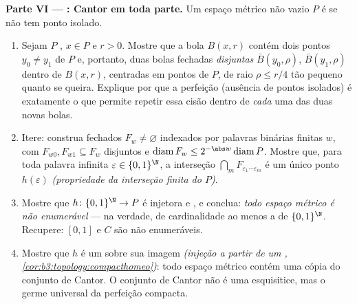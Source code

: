 \begin{problem}
\medskip
\noindent\textbf{Parte VI ---  : Cantor em toda
parte.} Um espaço métrico  não vazio $P$ é \emph{}
se não tem ponto isolado.
\begin{enumerate}[resume]
  \item Sejam $P$  , $x \in P$ e $r > 0$. Mostre
        que a bola $B(x, r)$ contém dois pontos $y_0
        \neq y_1$ de $P$ e, portanto,
        duas bolas fechadas \emph{disjuntas} $\bar B(y_0, \rho)$, $\bar B(y_1, \rho)$ dentro de
        $B(x, r)$, centradas em pontos de $P$, de raio $\rho
        \leq r/4$ tão pequeno
        quanto se queira. Explique por que a perfeição (ausência de
        pontos isolados) é exatamente o que permite repetir essa cisão
        dentro de \emph{cada} uma das duas novas bolas.
  \item Itere: construa fechados $F_w \neq \varnothing$ indexados por palavras binárias
        finitas $w$, com $F_{w0},
        F_{w1} \subseteq F_w$ disjuntos e $\operatorname{diam}F_w \leq 2^{-\abs w}
        \operatorname{diam}P$. Mostre que, para
        toda palavra infinita $\varepsilon \in \{0,1\}^\N$, a interseção $\bigcap_mF_{\varepsilon_1\cdots\varepsilon_m}$ é um único ponto
        $h(\varepsilon)$ \emph{(propriedade da interseção finita do 
        $P$)}.
  \item Mostre que $h\colon\{0,1\}^\N \to P$ é injetora e , e conclua: \emph{todo
        espaço métrico   é não enumerável} --- na
        verdade, de cardinalidade ao menos a de $\{0,1\}^\N$. Recupere:
        $[0,1]$ e $C$ são não enumeráveis.
  \item Mostre que $h$ é um  sobre sua imagem
        \emph{(injeção  a partir de um ,
        \cref{cor:b3:topology:compacthomeo})}: todo espaço métrico   contém
        uma cópia  do conjunto de Cantor. O conjunto de
        Cantor não é uma esquisitice, mas o germe universal da
        perfeição compacta.

\end{enumerate}
\end{problem}
